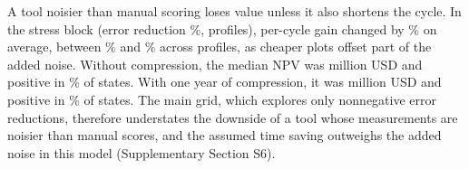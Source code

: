 A tool noisier than manual scoring loses value unless it also shortens the cycle. In the stress block (error reduction \NumCfgStressErr\%, \NumNcellsStress profiles), per-cycle gain changed by \NumStressUpliftPct\% on average, between \NumStressDiffMin\% and \NumStressDiffMax\% across profiles, as cheaper plots offset part of the added noise. Without compression, the median NPV was \NumStressNPVCycZero million USD and positive in \NumStressPrPosCycZero\% of states. With one year of compression, it was \NumStressNPVCycOne million USD and positive in \NumStressPrPosCycOne\% of states. The main grid, which explores only nonnegative error reductions, therefore understates the downside of a tool whose measurements are noisier than manual scores, and the assumed time saving outweighs the added noise in this model (Supplementary Section S6).
